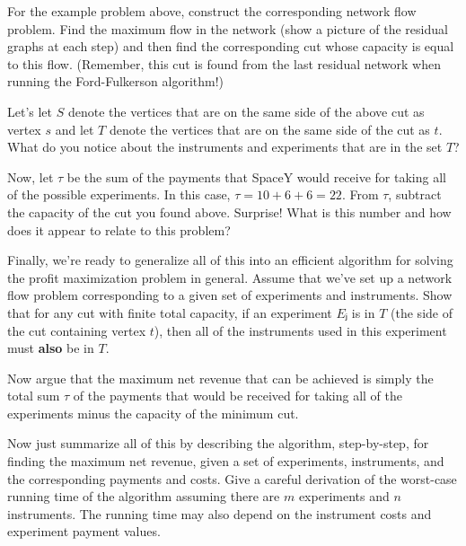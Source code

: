 \documentclass{ks-pset}
\begin{document}
\begin{problem}[SpaceY, 50]
\begin{subproblems}
    \item For the example problem above, construct the corresponding network
      flow problem.  Find the maximum flow in the network (show a picture of
      the residual graphs at each step) and then find the corresponding cut
      whose capacity is equal to this flow.  (Remember, this cut is found from
      the last residual network when running the Ford-Fulkerson algorithm!)

    \item Let's let \(S\) denote the vertices that are on the same side of the
      above cut as vertex \(s\) and let \(T\) denote the vertices that are on
      the same side of the cut as \(t\).  What do you notice about the
      instruments and experiments that are in the set \(T\)?

    \item Now, let \(τ\) be the sum of the payments that SpaceY would receive
      for taking all of the possible experiments.  In this case,
      \(τ=10+6+6=22\). From \(τ\), subtract the capacity of the cut you found
      above.  Surprise!  What is this number and how does it appear to relate
      to this problem?

    \item Finally, we're ready to generalize all of this into an efficient
      algorithm for solving the profit maximization problem in general.  Assume
      that we've set up a network flow problem corresponding to a given set of
      experiments and instruments. Show that for any cut with finite total
      capacity, if an experiment \(Eⱼ\) is in \(T\) (the side of the cut
      containing vertex \(t\)), then all of the instruments used in this
      experiment must \textbf{also} be in \(T\).

    \item Now argue that the maximum net revenue that can be achieved is simply
      the total sum \(τ\) of the payments that would be received for taking all
      of the experiments minus the capacity of the minimum cut.

    \item Now just summarize all of this by describing the algorithm,
      step-by-step, for finding the maximum net revenue, given a set of
      experiments, instruments, and the corresponding payments and costs.  Give
      a careful derivation of the worst-case running time of the algorithm
      assuming there are \(m\) experiments and \(n\) instruments. The running
      time may also depend on the instrument costs and experiment payment
      values.

  \end{subproblems}

\end{problem}
\end{document}
